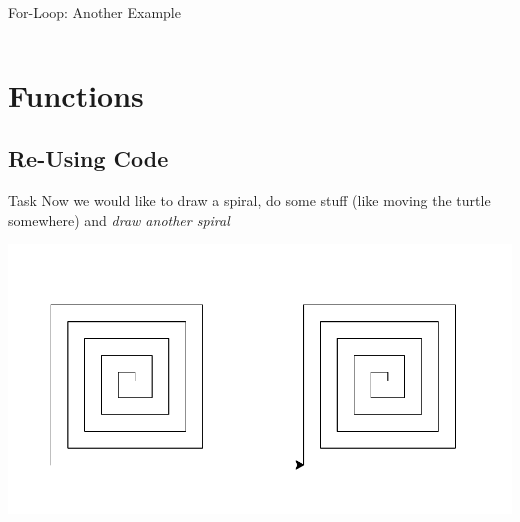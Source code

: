\begin{frame}[fragile]{For-Loop: Another Example}
\begin{columns}[totalwidth=\textwidth]
    \end{columns}

\end{frame}

\section{Functions}

\subsection{Re-Using Code}

\begin{frame}{}

    \vspace{0.5em}

    \begin{block}{Task}
        Now we would like to draw a spiral, do some stuff (like moving the turtle somewhere) and \textit{draw another spiral}
    \end{block}

    \vspace{-1em}

    \includegraphics[width = \textwidth]{03_Control_Structures/spiral2}

\end{frame}

